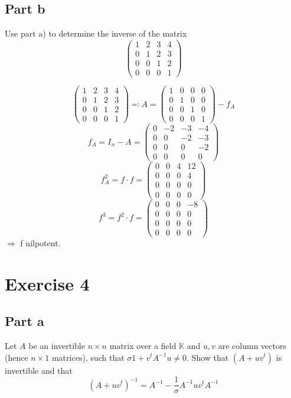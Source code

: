 \documentclass[a4paper]{article}
\theoremstyle{definition}
\begin{document}
\subsection{Part b}
\begin{ex}
  Use part a) to determine the inverse of the matrix
  \[
    \begin{pmatrix}
      1 & 2 & 3 & 4 \\
      0 & 1 & 2 & 3 \\
      0 & 0 & 1 & 2 \\
      0 & 0 & 0 & 1
    \end{pmatrix}
  \]
\end{ex}
\[
  \begin{pmatrix}
    1 & 2 & 3 & 4 \\
    0 & 1 & 2 & 3 \\
    0 & 0 & 1 & 2 \\
    0 & 0 & 0 & 1
  \end{pmatrix}
  \eqqcolon A
  = \begin{pmatrix}
    1 & 0 & 0 & 0 \\
    0 & 1 & 0 & 0 \\
    0 & 0 & 1 & 0 \\
    0 & 0 & 0 & 1
  \end{pmatrix}
  - f_A
\] \[
  f_A = I_n - A =
  \begin{pmatrix}
    0 & -2 & -3 & -4 \\
    0 & 0 & -2 & -3 \\
    0 & 0 & 0 & -2 \\
    0 & 0 & 0 & 0
  \end{pmatrix}
\] \[
  f^2_A = f \cdot f = \begin{pmatrix} 0 & 0 & 4 & 12 \\ 0 & 0 & 0 & 4 \\ 0 & 0 & 0 & 0 \\ 0 & 0 & 0 & 0 \end{pmatrix}
\] \[
  f^3 = f^2 \cdot f = \begin{pmatrix} 0 & 0 & 0 & -8 \\ 0 & 0 & 0 & 0 \\ 0 & 0 & 0 & 0 \\ 0 & 0 & 0 & 0 \end{pmatrix}
\]
$\Rightarrow$ f nilpotent.

\section{Exercise 4}
\subsection{Part a}
\begin{ex}
  Let $A$ be an invertible $n\times n$ matrix over a field $\mathbb K$ and $u,v$ are
  column vectors (hence $n\times 1$ matrices), such that $\sigma  1 + v^t A^{-1} u \neq 0$.
  Show that $(A + uv^t)$ is invertible and that
  \[ (A + uv^t)^{-1} = A^{-1} - \frac1{\sigma} A^{-1} uv^t A^{-1} \]
\end{ex}
\end{document}
